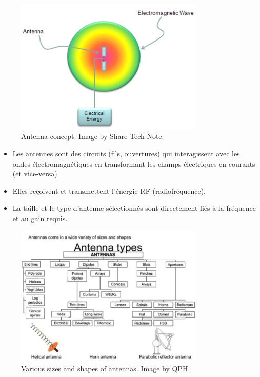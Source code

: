 \begin{figure}[H]
    \centering
    \includegraphics[width=0.8\textwidth]{figures/6-66.jpg}
    \caption{Antenna concept. Image by Share Tech Note.}
    \label{fig:communication3}
\end{figure}

\begin{itemize}
    \item Les antennes sont des circuits (fils, ouvertures) qui interagissent avec les ondes \'electromagn\'etiques en transformant les champs \'electriques en courants (et vice-versa).
    \item Elles re\c{c}oivent et transmettent l’\'energie RF (radiofr\'equence).
    \item La taille et le type d’antenne s\'electionn\'es sont directement li\'es \`a la fr\'equence et au gain requis.
\end{itemize}

\begin{figure}[H]
    \centering
    \includegraphics[width=0.8\textwidth]{figures/6-67.jpg}
    \caption{\href{https://www.slideserve.com/tariq/antennas-powerpoint-ppt-presentation}{Various sizes and shapes of antennas. Image by QPH.}}
    \label{fig:communication4}
\end{figure}


